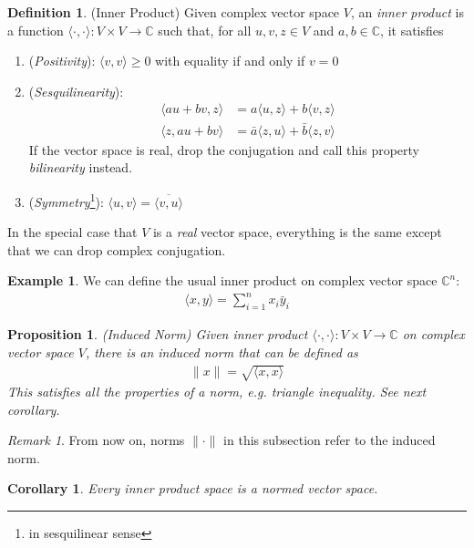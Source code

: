 \documentclass[12pt]{book}
\numberwithin{equation}{section} %
\theoremstyle{plain}
\newtheorem{prop}[thm]{Proposition}
\newtheorem{cor}[thm]{Corollary}
\theoremstyle{definition}
\newtheorem{defn}[thm]{Definition}
\newtheorem{ex}[thm]{Example}
\theoremstyle{remark}
\newtheorem*{rmk}{Remark}
\newcommand{\ra}{\rightarrow}
\newcommand{\C}{\mathbb{C}}
\newcommand{\Cn}{\mathbb{C}^n}
\begin{document}
\begin{defn}(Inner Product)
Given complex vector space $V$, an \emph{inner product} is a function
$\langle \cdot, \cdot \rangle: V\times V \ra \C$ such that, for all
$u,v,z\in V$ and $a,b\in\C$, it satisfies
\begin{enumerate}[label=(\roman*)]
  \item (\emph{Positivity}):
    $\langle v,v \rangle \geq 0$
    with equality if and only if $v=0$
  \item
    (\emph{Sesquilinearity}):
    \begin{align*}
      \langle au + bv, z\rangle
      &= a\langle u, z\rangle + b\langle v, z\rangle
      \\
      \langle z,au + bv\rangle
      &= \bar{a}\langle z, u\rangle + \bar{b}\langle z, v\rangle
    \end{align*}
    If the vector space is real, drop the conjugation and call this
    property \emph{bilinearity} instead.

  \item (\emph{Symmetry}\footnote{in sesquilinear sense}):
    $\langle u,v\rangle = \overline{\langle v,u\rangle}$
\end{enumerate}
In the special case that $V$ is a \emph{real} vector space, everything
is the same except that we can drop complex conjugation.
\end{defn}

\begin{ex}
We can define the usual inner product on complex vector space $\Cn$:
\begin{align*}
  \langle x,y\rangle = \sum_{i=1}^n x_i \bar{y}_i
\end{align*}
\end{ex}

\begin{prop}\emph{(Induced Norm)}
Given inner product $\langle \cdot, \cdot \rangle: V\times V \ra \C$ on
complex vector space $V$, there is an \emph{induced norm} that can be
defined as
\begin{align*}
  \lVert x\rVert = \sqrt{\langle x, x\rangle}
\end{align*}
This satisfies all the properties of a norm, e.g. triangle
inequality. See next corollary.
\end{prop}
\begin{rmk}
From now on, norms $\lVert \cdot \rVert$ in this
subsection refer to the induced norm.
\end{rmk}

\begin{cor}
Every inner product space is a normed vector space.
\end{cor}
\end{document}
